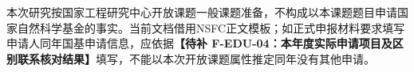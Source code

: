 \justifying
\NSFCBodyText

本次研究按国家工程研究中心开放课题一般课题准备，不构成以本课题题目申请国家自然科学基金的事实。当前文档借用NSFC正文模板；如正式申报材料要求填写申请人同年国基申请信息，应依据\textbf{【待补 F-EDU-04：本年度实际申请项目及区别联系核对结果】}填写，不能以本次开放课题属性推定同年没有其他申请。
